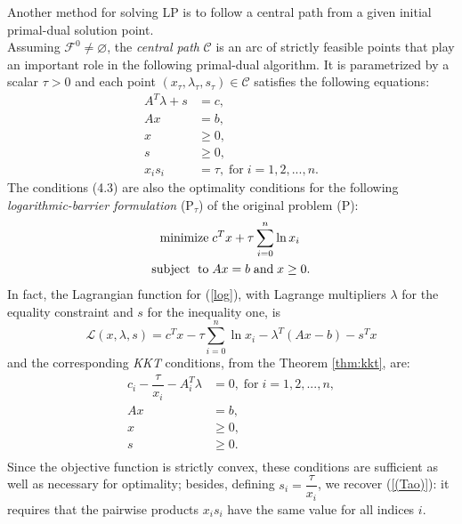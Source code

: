 \documentclass[a4paper,10 pt,titlepage,twoside]{book}
\theoremstyle{plain}
\theoremstyle{definition}
\theoremstyle{remark}
\begin{document}
Another method for solving LP is to follow a central path from a given initial primal-dual solution point.\\ Assuming $\mathcal{F}^{0}\neq \varnothing$, the \textit{central path} $\mathcal{C}$ is an arc of strictly feasible points that play an important role in the following primal-dual algorithm. It is parametrized by a scalar $\tau  > 0$ and each point $(x_{\tau}, \lambda_{\tau}, s_{\tau})\in \mathcal{C}$ satisfies the following equations:
\begin{align}
A^{T}\lambda+s&=c,\tag{4.3a}\\
Ax&=b,\tag{4.3b}\\\label{KKT2}
x&\geq 0,\tag{4.3c}\\
s&\geq 0,\tag{4.3d}\\
x_{i}s_{i}&= \tau,\; \text{for}\;i= 1,2,...,n.\tag{4.3e}\label{(Tao)}
\end{align} 
The conditions (4.3) are also the optimality conditions for the following \textit{logarithmic-barrier formulation} (P$_{\tau}$) of the original problem (P):
\begin{equation}\label{log}
\begin{split}
\text{minimize\;} &c^{T}x + \tau\sum_{i=0}^{n}\ln{x_{i}}\\
\text{subject\; to\;}&Ax = b\;\text{and\;} x\geq0.
\end{split}
\end{equation}
In fact, the Lagrangian function for (\ref{log}), with Lagrange multipliers $\lambda$ for the equality constraint and $s$ for the inequality one, is
\begin{equation}
\mathcal{L}(x,\lambda,s)=c^{T}x- \tau\sum_{i=0}^{n}\ln{x_{i}}-\lambda^{T}\left(Ax-b\right)-s^{T}x
\end{equation}
and the corresponding \textit{KKT} conditions, from the Theorem \ref{thm:kkt}, are:
\begin{align*}
c_{i} - \dfrac{\tau}{x_{i}} - A^{T}_{i}\lambda&= 0,\; \text{for}\;i = 1,2,...,n,\\
Ax&=b,\\
x&\geq 0,\\
s&\geq 0.\\
\end{align*}  
Since the objective function is strictly convex, these conditions are sufficient as well as necessary for optimality; besides, defining $s_{i} = \dfrac{\tau}{x_{i}}$, we recover (\ref{(Tao)}): it requires that the pairwise products $x_{i}s_{i}$ have the same value for all indices $i$.\\[0.5cm]
\end{document}
